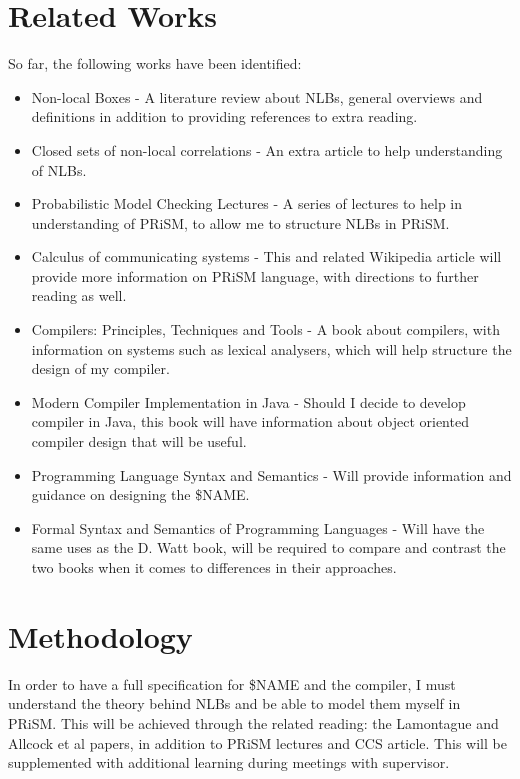 \documentclass[11pt, a4paper]{article}
\begin{document}

\section{Related Works} %
\label{sec:related_works}
So far, the following works have been identified:
\begin{itemize}
    \item Non-local Boxes \parencite{nlb_lamontague} - A literature review about
    NLBs, general overviews and definitions in addition to providing references
    to extra reading.
    \item Closed sets of non-local correlations
    \parencite{Jonathan-Allcock:2009pd} - An extra article to help understanding
    of NLBs.
    \item Probabilistic Model Checking Lectures \parencite{prism_lectures} - A
    series of lectures to help in understanding of PRiSM, to allow me to
    structure NLBs in PRiSM.
    \item Calculus of communicating systems \parencite{ccs} - This and related
    Wikipedia article will provide more information on PRiSM language, with
    directions to further reading as well. 
    \item Compilers: Principles, Techniques and Tools
    \parencite{dragon_compiler} - A book about compilers, with information on
    systems such as lexical analysers, which will help structure the design of
    my compiler.
    \item Modern Compiler Implementation in Java \parencite{java_compiler} -
    Should I decide to develop compiler in Java, this book will have information
    about object oriented compiler design that will be useful.
    \item Programming Language Syntax and Semantics \parencite{plss} - Will
    provide information and guidance on designing the \$NAME.
    \item Formal Syntax and Semantics of Programming Languages \parencite{fsspl}
    - Will have the same uses as the D. Watt book, will be required to compare
    and contrast the two books when it comes to differences in their approaches.
\end{itemize}


\section{Methodology} %
\label{sec:methodology}
In order to have a full specification for \$NAME and the compiler, I must 
understand the theory behind NLBs and be able to model them myself in PRiSM.
This will be achieved through the related reading: the Lamontague and Allcock et
al papers, in addition to PRiSM lectures and CCS article. This will be
supplemented with additional learning during meetings with supervisor.
\end{document}
